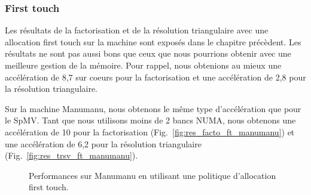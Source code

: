 \subsubsection{First touch}
Les résultats de la factorisation et de la résolution triangulaire avec une allocation first touch sur la machine  sont exposés dans le chapitre précèdent.
%
Les résultats ne sont pas aussi bons que ceux que nous pourrions obtenir avec une meilleure gestion de la mémoire.
%
Pour rappel, nous obtenions au mieux une accélération de 8,7 sur coeurs pour la factorisation et une accélération de 2,8 pour la résolution triangulaire.


Sur la machine Manumanu, nous obtenons le même type d'accélération que pour le SpMV.
%
Tant que nous utilisons moins de 2 bancs NUMA, nous obtenons une accélération de 10 pour la factorisation (Fig.~\ref{fig:res_facto_ft_manumanu}) et une accélération de 6,2 pour la résolution triangulaire (Fig.~\ref{fig:res_trsv_ft_manumanu}).


\begin{figure}[!ht]
     \begin{center}
    \end{center}
    \caption{Performances sur Manumanu en utilisant une politique d'allocation first touch.}
\end{figure}
